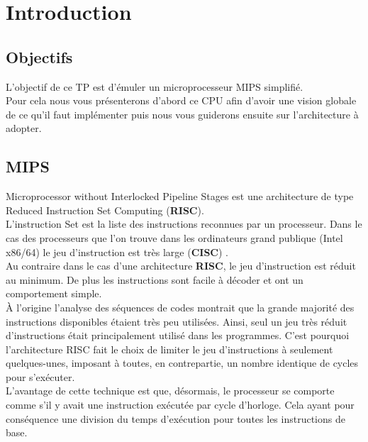 \section{Introduction}

\subsection{Objectifs}

L'objectif de ce TP est d'émuler un microprocesseur MIPS simplifié.\\ Pour cela
nous vous présenterons d'abord ce CPU afin d'avoir une vision globale de ce
qu'il faut implémenter puis nous vous guiderons ensuite sur l'architecture à
adopter.

\subsection{MIPS}

        Microprocessor without Interlocked Pipeline Stages est une architecture
        de type Reduced Instruction Set Computing (\textbf{RISC}).\\ \indent
        L'instruction Set est la liste des instructions reconnues par un
        processeur. Dans le cas des processeurs que l'on trouve dans les
        ordinateurs grand publique (Intel x86/64) le jeu d'instruction est très
        large (\textbf{CISC}) .\\ \indent Au contraire dans le cas d'une
        architecture \textbf{RISC}, le jeu d'instruction est réduit au minimum.
        De plus les instructions sont facile à décoder et ont un comportement
        simple.\\
    
    À l'origine l'analyse des séquences de codes montrait que la grande majorité
    des instructions disponibles étaient très peu utilisées. Ainsi, seul un jeu
    très réduit d'instructions était principalement utilisé dans les programmes.
    C'est pourquoi l'architecture RISC fait le choix de limiter le jeu
    d'instructions à seulement quelques-unes, imposant à toutes, en
    contrepartie, un nombre identique de cycles pour s'exécuter. \\
    
    L'avantage de cette technique est que, désormais, le processeur se comporte
    comme s'il y avait une instruction exécutée par cycle d'horloge. Cela ayant
    pour conséquence une division du temps d'exécution pour toutes les
    instructions de base.


\newpage
